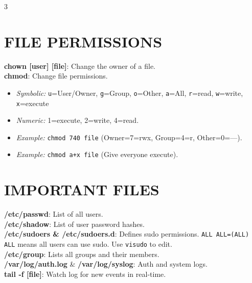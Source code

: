 \documentclass[7pt,landscape]{article}
\begin{document}
\begin{multicols*}{3}
\section{FILE PERMISSIONS}
\textbf{chown [user] [file]}: Change the owner of a file. \\
\textbf{chmod}: Change file permissions.
\begin{itemize}
    \item \textit{Symbolic:} \texttt{u}=User/Owner, \texttt{g}=Group, \texttt{o}=Other, \texttt{a}=All, \texttt{r}=read, \texttt{w}=write, \texttt{x}=execute
    \item \textit{Numeric:} 1=execute, 2=write, 4=read.
    \item \textit{Example:} \texttt{chmod 740 file} (Owner=7=rwx, Group=4=r, Other=0=---).
    \item \textit{Example:} \texttt{chmod a+x file} (Give everyone execute).
\end{itemize}

\section{IMPORTANT FILES}
\textbf{/etc/passwd}: List of all users. \\
\textbf{/etc/shadow}: List of user password hashes. \\
\textbf{/etc/sudoers \& /etc/sudoers.d}: Defines sudo permissions. \texttt{ALL ALL=(ALL) ALL} means all users can use sudo. Use \texttt{visudo} to edit. \\
\textbf{/etc/group}: Lists all groups and their members. \\
\textbf{/var/log/auth.log} \& \textbf{/var/log/syslog}: Auth and system logs. \\
\textbf{tail -f [file]}: Watch log for new events in real-time.


\end{multicols*}
\end{document}

